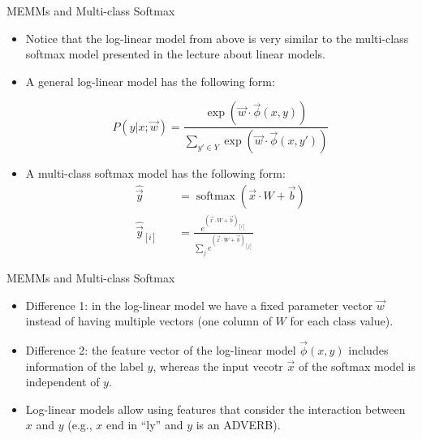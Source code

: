 \documentclass[handout]{beamer}
\begin{document}
\begin{frame}{MEMMs and Multi-class Softmax}
\begin{scriptsize}
\begin{itemize}
\item Notice that the log-linear model from above is very similar to the multi-class softmax model presented in the lecture about linear models.

\item A general log-linear model has the following form:

\begin{displaymath}
 P( y | x; \vec{w}) = \frac{\exp (\vec{w}\cdot \vec{\phi}(x,y))}{\sum_{y' \in Y} \exp (\vec{w}\cdot \vec{\phi}(x,y'))}
\end{displaymath}


\item A multi-class softmax model has the following form:
\begin{equation}
\begin{split}
\hat{\vec{y}} \quad & =  \operatorname{softmax}(\vec{x} \cdot W + \vec{b})  \\
\hat{\vec{y}}_{[i]} \quad & = \frac{e^{(\vec{x} \cdot W + \vec{b})_{[i]}}}{\sum_j e^{(\vec{x} \cdot W + \vec{b})_{[j]}}}
\end{split}
\end{equation}

 
\end{itemize}


\end{scriptsize}
\end{frame}




\begin{frame}{MEMMs and Multi-class Softmax}
\begin{scriptsize}
\begin{itemize}

\item Difference 1: in the log-linear model we have a fixed parameter vector $\vec{w}$ instead of having multiple vectors (one column of $W$ for each class value).

\item Difference 2: the feature vector of the log-linear model $\vec{\phi}(x,y)$ includes information of the label $y$, whereas the input vecotr $\vec{x}$ of the softmax model is independent of $y$. 

\item Log-linear models allow using features that consider the interaction between $x$ and $y$ (e.g., $x$ end in ``ly'' and $y$ is an ADVERB).

 
\end{itemize}


\end{scriptsize}
\end{frame}
\end{document}
